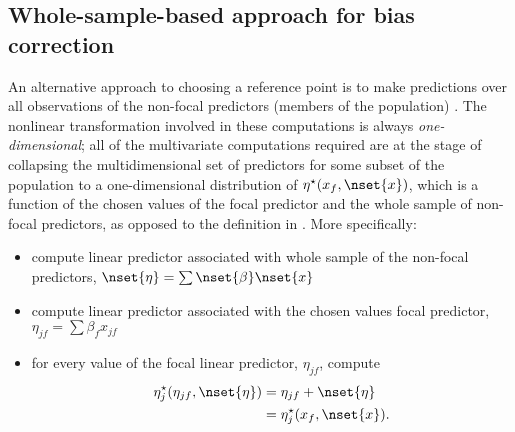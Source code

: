 
\subsection{Whole-sample-based approach for bias correction}

An alternative approach to choosing a reference point is to make predictions over all observations of the non-focal predictors (members of the population) \citep{hanmer2013behind}. The nonlinear transformation involved in these computations is always \emph{one-dimensional}; all of the multivariate computations required are at the stage of collapsing the multidimensional set of predictors for some subset of the population to a one-dimensional distribution of $\eta^\star(x_f, \nset{x})$, which is a function of the chosen values of the focal predictor and the whole sample of non-focal predictors, as opposed to the definition in . More specifically:
\begin{itemize}
\item compute linear predictor associated with whole sample of the non-focal predictors, $\nset{\eta} = \sum \nset{\beta} \nset{x}$
\item compute linear predictor associated with the chosen values focal predictor, $\eta_{jf} = \sum{\beta_f x_{jf}}$
\item for every value of the focal linear predictor, $\eta_{jf}$, compute
%
\begin{align}\label{eq:pop_eta} 
\eta_j^\star(\eta_{jf}, \nset{\eta})  &= \eta_{jf} + \nset{\eta} \nonumber \\
&= \eta_j^\star(x_f, \nset{x}).
\end{align}
\end{itemize}
%

